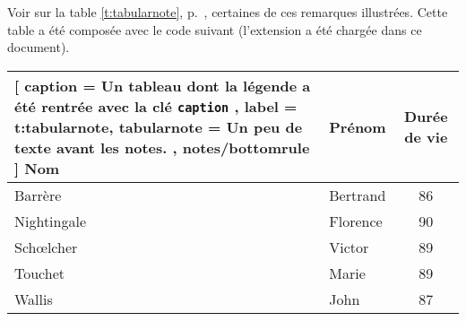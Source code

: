 \documentclass[dvipsnames]{article}%
\begin{document}
%
Voir sur la table \ref{t:tabularnote}, p.~\pageref{t:tabularnote}, certaines de ces
remarques illustrées. Cette table a été composée avec le code suivant
(l'extension  a été chargée dans ce document).

\bigskip
\begin{scope}
\small
\begin{Code}
\begin{table}[hbt]
\centering
{}
\begin{NiceTabular}{@{}llc@{}}%
  [
   caption = Un tableau dont la légende a été rentrée avec la clé \texttt{caption}%
              \emph{} ,
   label = t:tabularnote, 
   tabularnote = Un peu de texte avant les notes. ,
   notes/bottomrule
  ]
\toprule
Nom       & Prénom   & Durée de vie \\
\midrule
Barrère   & Bertrand & 86\\
Nightingale\emph{%
           } 
          & Florence\emph{} & 90 \\
Schœlcher & Victor   & 89\emph{}\\
Touchet   & Marie\emph{} & 89 \\
Wallis    & John     & 87 \\
\bottomrule
\end{NiceTabular}
\end{table}
\end{Code}%
\end{scope}
\end{document}
